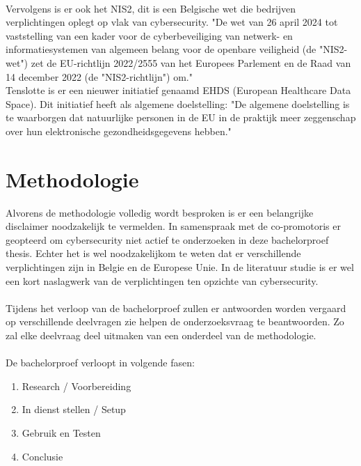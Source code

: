 \\
Vervolgens is er ook het NIS2, dit is een Belgische wet die bedrijven verplichtingen oplegt op vlak van cybersecurity. "De wet van 26 april 2024 tot vaststelling van een kader voor de cyberbeveiliging van netwerk- en informatiesystemen van algemeen belang voor de openbare veiligheid (de "NIS2-wet") zet de EU-richtlijn 2022/2555 van het Europees Parlement en de Raad van 14 december 2022 (de "NIS2-richtlijn") om." \autocite{Belgium2024}
\\
Tenslotte is er een nieuwer initiatief genaamd EHDS (European Healthcare Data Space). Dit initiatief heeft als algemene doelstelling: "De algemene doelstelling is te waarborgen dat natuurlijke personen in de EU in de praktijk meer zeggenschap over hun elektronische gezondheidsgegevens hebben." \autocite{EHDS2022}


\section{Methodologie}%
\label{sec:methodologie}

Alvorens de methodologie volledig wordt besproken is er een belangrijke disclaimer noodzakelijk te vermelden.
In samenspraak met de co-promotoris er geopteerd om cybersecurity niet actief te onderzoeken in deze bachelorproef thesis. Echter het is wel noodzakelijkom te weten dat er verschillende verplichtingen zijn in Belgie en de Europese Unie. In de literatuur studie is er wel een kort naslagwerk van de verplichtingen ten opzichte van cybersecurity.
\\\\
Tijdens het verloop van de bachelorproef zullen er antwoorden worden vergaard op verschillende deelvragen zie helpen de onderzoeksvraag te beantwoorden. Zo zal elke deelvraag deel uitmaken van een onderdeel van de methodologie.
\\\\
De bachelorproef verloopt in volgende fasen:

\begin{enumerate}
  \item Research / Voorbereiding
  \item In dienst stellen / Setup
  \item Gebruik en Testen
  \item Conclusie
\end{enumerate}

